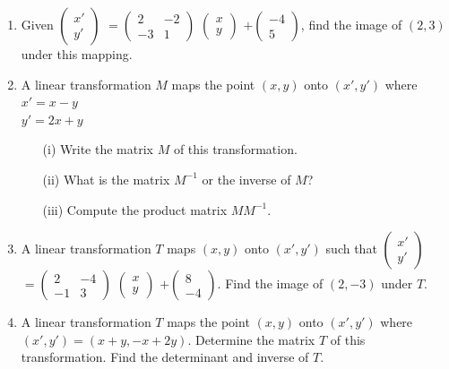 \begin{enumerate}
	\item Given $
	\begin{pmatrix}
	x' \\
	y'
	\end{pmatrix}$ $ =
	\begin{pmatrix}
	2 & -2 \\
	-3 & 1
	\end{pmatrix}$ $
	\begin{pmatrix}
	x \\
	y
	\end{pmatrix}$ $ +
	\begin{pmatrix}
	-4 \\
	5
	\end{pmatrix}$, find the image of $(2,3)$ under this mapping.
	
	\item A linear transformation $M$ maps the point $(x,y)$ onto $(x',y')$ where \\
	$x' = x - y$\\
	$y' = 2x + y$
		\begin{itemize}
		\item[(i)] Write the matrix $M$ of this transformation.
		\item[(ii)] What is the matrix $M^{-1}$ or the inverse of $M$?
		\item[(iii)] Compute the product matrix $MM^{-1}$.
		\end{itemize}
	
	\item A linear transformation $T$ maps $(x,y)$ onto $(x',y')$ such that $
	\begin{pmatrix}
	x' \\
	y'
	\end{pmatrix}$ $ =
	\begin{pmatrix}
	2 & -4 \\
	-1 & 3
	\end{pmatrix}$ $
	\begin{pmatrix}
	x \\
	y
	\end{pmatrix}$ $ +
	\begin{pmatrix}
	8 \\
	-4
	\end{pmatrix}$. Find the image of $(2,-3)$ under $T$.
	
	\item A linear transformation $T$ maps the point $(x,y)$ onto $(x',y')$ where $(x',y') = (x + y, -x + 2y)$. Determine the matrix $T$ of this transformation. Find the determinant and inverse of $T$.
	

\end{enumerate}
